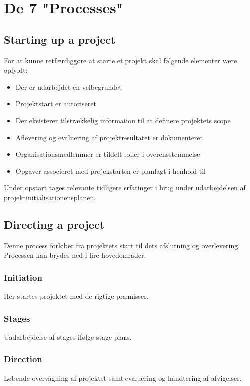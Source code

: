 \chapter{De 7 "Processes"}

\section{Starting up a project}
For at kunne retfærdiggøre at starte et projekt skal følgende elementer være opfyldt:

\begin{itemize}
    \item Der er udarbejdet en velbegrundet 
    \item Projektstart er autoriseret
    \item Der eksisterer tilstrækkelig information til at definere projektets scope
    \item Aflevering og evaluering af projektresultatet er dokumenteret
    \item Organisationsmedlemmer er tildelt roller i overensstemmelse 
    \item Opgaver associeret med projekstarten er planlagt i henhold til 
\end{itemize}

Under opstart tages relevante tidligere erfaringer i brug under udarbejdelsen af projektinitialisationensplanen.

\section{Directing a project}
Denne process forløber fra projektets start til dets afslutning og overlevering. Processen kan brydes ned i fire hovedområder:

\subsection{Initiation}
\label{sec:initiation}
Her startes projektet med de rigtige præmisser.

\subsection{Stages}
Uadarbejdelse af stages ifølge stage plans.

\subsection{Direction}
Løbende overvågning af projektet samt evaluering og håndtering af afvigelser.

